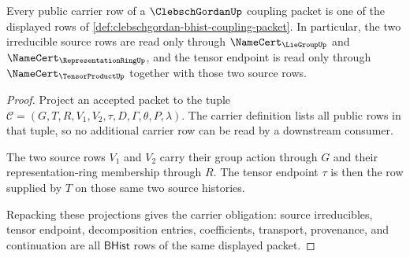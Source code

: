 \begin{theorem}
\label{thm:clebschgordan-carrier-source-obligation}
Every public carrier row of a $\ClebschGordanUp$ coupling packet is one of the
displayed rows of
\autoref{def:clebschgordan-bhist-coupling-packet}. In particular, the two
irreducible source rows are read only through
$\NameCert_{\LieGroupUp}$ and $\NameCert_{\RepresentationRingUp}$, and the
tensor endpoint is read only through $\NameCert_{\TensorProductUp}$ together
with those two source rows.
\end{theorem}
\begin{proof}
Project an accepted packet to the tuple
$\mathcal{C}=(G,T,R,V_{1},V_{2},\tau,D,\Gamma,\theta,P,\lambda)$. The carrier
definition lists all public rows in that tuple, so no additional carrier row
can be read by a downstream consumer.

The two source rows $V_{1}$ and $V_{2}$ carry their group action through $G$
and their representation-ring membership through $R$. The tensor endpoint
$\tau$ is then the row supplied by $T$ on those same two source histories.

Repacking these projections gives the carrier obligation: source
irreducibles, tensor endpoint, decomposition entries, coefficients,
transport, provenance, and continuation are all $\mathsf{BHist}$ rows of the
same displayed packet.
\end{proof}


